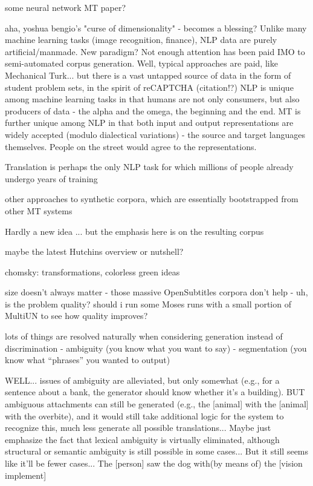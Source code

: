 some neural network MT paper?

aha, yoshua bengio's "curse of dimensionality" - becomes a blessing?  
Unlike many machine learning tasks (image recognition, finance), NLP data are purely artificial/manmade.  New paradigm?  Not enough attention has been paid IMO to semi-automated corpus generation.  Well, typical approaches are paid, like Mechanical Turk... but there is a vast untapped source of data in the form of student problem sets, in the spirit of reCAPTCHA (citation!?)
NLP is unique among machine learning tasks in that humans are not only consumers, but also producers of data - the alpha and the omega, the beginning and the end.
MT is further unique among NLP in that both input and output representations are widely accepted (modulo dialectical variations) - the source and target languages themselves.
People on the street would agree to the representations.


Translation is perhaps the only NLP task for which millions of people already undergo years of training

other approaches to synthetic corpora, which are essentially bootstrapped from other MT systems

Hardly a new idea ... but the emphasis here is on the resulting corpus





maybe the latest Hutchins overview or nutshell?


chomsky: transformations, colorless green ideas


size doesn't always matter - those massive OpenSubtitles corpora don't help
- uh, is the problem quality? should i run some Moses runs with a small portion of MultiUN to see how quality improves?

lots of things are resolved naturally when considering generation instead of discrimination
- ambiguity (you know what you want to say)
- segmentation (you know what ``phrases'' you wanted to output)

WELL... issues of ambiguity are alleviated, but only somewhat (e.g., for a sentence about a bank, the generator should know whether it's a building). 
BUT ambiguous attachments can still be generated (e.g., the [animal] with the [animal] with the overbite), and it would still take additional logic for the system to recognize this, much less generate all possible translations...
Maybe just emphasize the fact that lexical ambiguity is virtually eliminated, although structural or semantic ambiguity is still possible in some cases...
But it still seems like it'll be fewer cases... The [person] saw the dog with(by means of) the [vision implement]


